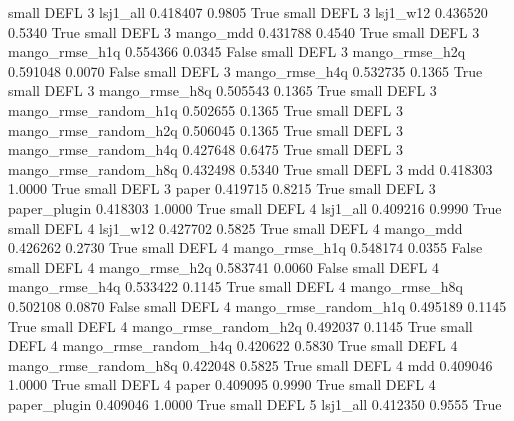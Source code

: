      small     DEFL                 3              lsj1_all   0.418407      0.9805    True
     small     DEFL                 3              lsj1_w12   0.436520      0.5340    True
     small     DEFL                 3             mango_mdd   0.431788      0.4540    True
     small     DEFL                 3        mango_rmse_h1q   0.554366      0.0345   False
     small     DEFL                 3        mango_rmse_h2q   0.591048      0.0070   False
     small     DEFL                 3        mango_rmse_h4q   0.532735      0.1365    True
     small     DEFL                 3        mango_rmse_h8q   0.505543      0.1365    True
     small     DEFL                 3 mango_rmse_random_h1q   0.502655      0.1365    True
     small     DEFL                 3 mango_rmse_random_h2q   0.506045      0.1365    True
     small     DEFL                 3 mango_rmse_random_h4q   0.427648      0.6475    True
     small     DEFL                 3 mango_rmse_random_h8q   0.432498      0.5340    True
     small     DEFL                 3                   mdd   0.418303      1.0000    True
     small     DEFL                 3                 paper   0.419715      0.8215    True
     small     DEFL                 3          paper_plugin   0.418303      1.0000    True
     small     DEFL                 4              lsj1_all   0.409216      0.9990    True
     small     DEFL                 4              lsj1_w12   0.427702      0.5825    True
     small     DEFL                 4             mango_mdd   0.426262      0.2730    True
     small     DEFL                 4        mango_rmse_h1q   0.548174      0.0355   False
     small     DEFL                 4        mango_rmse_h2q   0.583741      0.0060   False
     small     DEFL                 4        mango_rmse_h4q   0.533422      0.1145    True
     small     DEFL                 4        mango_rmse_h8q   0.502108      0.0870   False
     small     DEFL                 4 mango_rmse_random_h1q   0.495189      0.1145    True
     small     DEFL                 4 mango_rmse_random_h2q   0.492037      0.1145    True
     small     DEFL                 4 mango_rmse_random_h4q   0.420622      0.5830    True
     small     DEFL                 4 mango_rmse_random_h8q   0.422048      0.5825    True
     small     DEFL                 4                   mdd   0.409046      1.0000    True
     small     DEFL                 4                 paper   0.409095      0.9990    True
     small     DEFL                 4          paper_plugin   0.409046      1.0000    True
     small     DEFL                 5              lsj1_all   0.412350      0.9555    True
